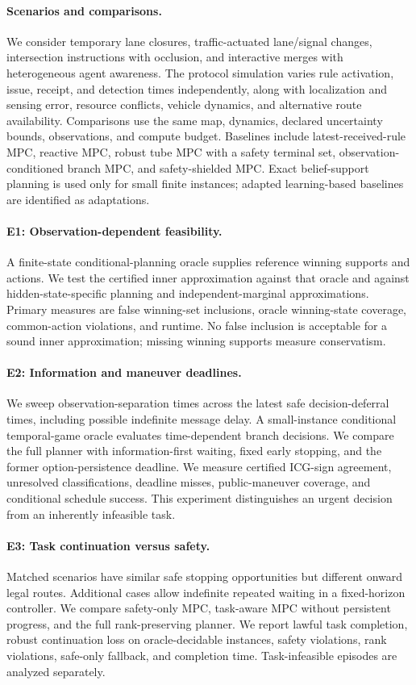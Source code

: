 \documentclass[letterpaper]{article} %
\begin{document}
\paragraph{Scenarios and comparisons.}
We consider temporary lane closures, traffic-actuated lane/signal changes, intersection instructions with occlusion, and interactive merges with heterogeneous agent awareness. The protocol simulation varies rule activation, issue, receipt, and detection times independently, along with localization and sensing error, resource conflicts, vehicle dynamics, and alternative route availability. Comparisons use the same map, dynamics, declared uncertainty bounds, observations, and compute budget. Baselines include latest-received-rule MPC, reactive MPC, robust tube MPC with a safety terminal set, observation-conditioned branch MPC, and safety-shielded MPC. Exact belief-support planning is used only for small finite instances; adapted learning-based baselines are identified as adaptations.

\paragraph{E1: Observation-dependent feasibility.}
A finite-state conditional-planning oracle supplies reference winning supports and actions. We test the certified inner approximation against that oracle and against hidden-state-specific planning and independent-marginal approximations. Primary measures are false winning-set inclusions, oracle winning-state coverage, common-action violations, and runtime. No false inclusion is acceptable for a sound inner approximation; missing winning supports measure conservatism.

\paragraph{E2: Information and maneuver deadlines.}
We sweep observation-separation times across the latest safe decision-deferral times, including possible indefinite message delay. A small-instance conditional temporal-game oracle evaluates time-dependent branch decisions. We compare the full planner with information-first waiting, fixed early stopping, and the former option-persistence deadline. We measure certified ICG-sign agreement, unresolved classifications, deadline misses, public-maneuver coverage, and conditional schedule success. This experiment distinguishes an urgent decision from an inherently infeasible task.

\paragraph{E3: Task continuation versus safety.}
Matched scenarios have similar safe stopping opportunities but different onward legal routes. Additional cases allow indefinite repeated waiting in a fixed-horizon controller. We compare safety-only MPC, task-aware MPC without persistent progress, and the full rank-preserving planner. We report lawful task completion, robust continuation loss on oracle-decidable instances, safety violations, rank violations, safe-only fallback, and completion time. Task-infeasible episodes are analyzed separately.
\end{document}
